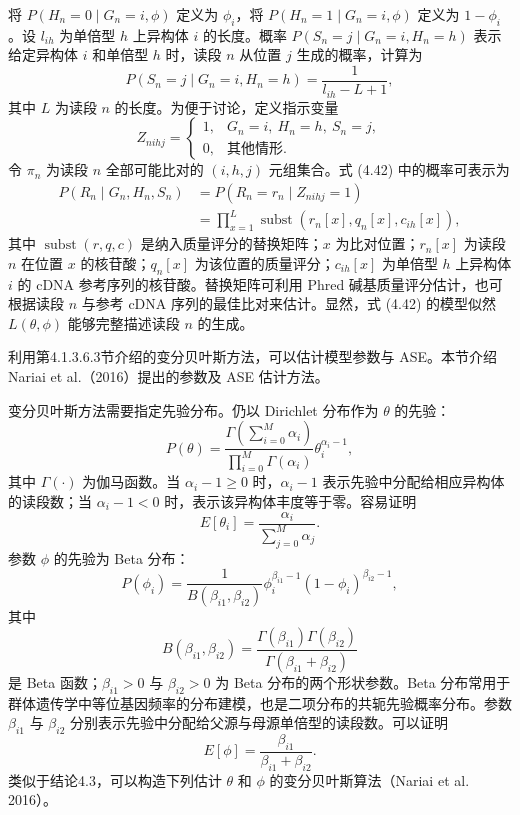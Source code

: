 将 $P(H_n=0\mid G_n=i,\phi)$ 定义为 $\phi_i$，将 $P(H_n=1\mid G_n=i,\phi)$ 定义为 $1-\phi_i$。设 $l_{ih}$ 为单倍型 $h$ 上异构体 $i$ 的长度。概率 $P(S_n=j\mid G_n=i,H_n=h)$ 表示给定异构体 $i$ 和单倍型 $h$ 时，读段 $n$ 从位置 $j$ 生成的概率，计算为
\[
P(S_n=j\mid G_n=i,H_n=h)=\frac1{l_{ih}-L+1},
\]
其中 $L$ 为读段 $n$ 的长度。为便于讨论，定义指示变量
\begin{equation}
Z_{nihj}=\begin{cases}
1,&G_n=i,\ H_n=h,\ S_n=j,\\
0,&\text{其他情形}.
\end{cases}
\tag{4.43}
\end{equation}
令 $\pi_n$ 为读段 $n$ 全部可能比对的 $(i,h,j)$ 元组集合。式 (4.42) 中的概率可表示为
\begin{equation}
\begin{aligned}
P(R_n\mid G_n,H_n,S_n)&=P(R_n=r_n\mid Z_{nihj}=1)\\
&=\prod_{x=1}^{L}\operatorname{subst}(r_n[x],q_n[x],c_{ih}[x]),
\end{aligned}
\tag{4.44}
\end{equation}
其中 $\operatorname{subst}(r,q,c)$ 是纳入质量评分的替换矩阵；$x$ 为比对位置；$r_n[x]$ 为读段 $n$ 在位置 $x$ 的核苷酸；$q_n[x]$ 为该位置的质量评分；$c_{ih}[x]$ 为单倍型 $h$ 上异构体 $i$ 的 cDNA 参考序列的核苷酸。替换矩阵可利用 Phred 碱基质量评分估计，也可根据读段 $n$ 与参考 cDNA 序列的最佳比对来估计。显然，式 (4.42) 的模型似然 $L(\theta,\phi)$ 能够完整描述读段 $n$ 的生成。


利用第4.1.3.6.3节介绍的变分贝叶斯方法，可以估计模型参数与 ASE。本节介绍 Nariai et al.（2016）提出的参数及 ASE 估计方法。

变分贝叶斯方法需要指定先验分布。仍以 Dirichlet 分布作为 $\theta$ 的先验：
\begin{equation}
P(\theta)=\frac{\Gamma\left(\sum_{i=0}^{M}\alpha_i\right)}
{\prod_{i=0}^{M}\Gamma(\alpha_i)}\theta_i^{\alpha_i-1},
\tag{4.45}
\end{equation}
其中 $\Gamma(\cdot)$ 为伽马函数。当 $\alpha_i-1\ge0$ 时，$\alpha_i-1$ 表示先验中分配给相应异构体的读段数；当 $\alpha_i-1<0$ 时，表示该异构体丰度等于零。容易证明
\begin{equation}
E[\theta_i]=\frac{\alpha_i}{\sum_{j=0}^{M}\alpha_j}.
\tag{4.46}
\end{equation}
参数 $\phi$ 的先验为 Beta 分布：
\begin{equation}
P(\phi_i)=\frac1{B(\beta_{i1},\beta_{i2})}\phi_i^{\beta_{i1}-1}(1-\phi_i)^{\beta_{i2}-1},
\tag{4.47}
\end{equation}
其中
\[
B(\beta_{i1},\beta_{i2})=\frac{\Gamma(\beta_{i1})\Gamma(\beta_{i2})}{\Gamma(\beta_{i1}+\beta_{i2})}
\]
是 Beta 函数；$\beta_{i1}>0$ 与 $\beta_{i2}>0$ 为 Beta 分布的两个形状参数。Beta 分布常用于群体遗传学中等位基因频率的分布建模，也是二项分布的共轭先验概率分布。参数 $\beta_{i1}$ 与 $\beta_{i2}$ 分别表示先验中分配给父源与母源单倍型的读段数。可以证明
\begin{equation}
E[\phi]=\frac{\beta_{i1}}{\beta_{i1}+\beta_{i2}}.
\tag{4.48}
\end{equation}
类似于结论4.3，可以构造下列估计 $\theta$ 和 $\phi$ 的变分贝叶斯算法（Nariai et al. 2016）。

